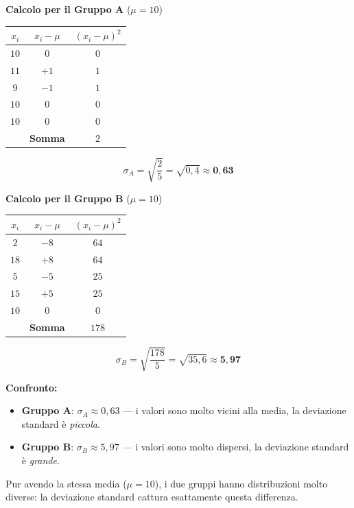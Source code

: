 \documentclass[12pt, a4paper]{article}
\begin{document}
\medskip
\noindent\textbf{Calcolo per il Gruppo A} \quad ($\mu = 10$)

\begin{center}
\begin{tabular}{ccc}
\toprule
$x_i$ & $x_i - \mu$ & $(x_i - \mu)^2$ \\
\midrule
$10$ & $0$  & $0$ \\
$11$ & $+1$ & $1$ \\
$9$  & $-1$ & $1$ \\
$10$ & $0$  & $0$ \\
$10$ & $0$  & $0$ \\
\midrule
     & \textbf{Somma} & $2$ \\
\bottomrule
\end{tabular}
\end{center}

\[
  \sigma_A = \sqrt{\dfrac{2}{5}} = \sqrt{0{,}4} \approx \mathbf{0{,}63}
\]

\medskip
\noindent\textbf{Calcolo per il Gruppo B} \quad ($\mu = 10$)

\begin{center}
\begin{tabular}{ccc}
\toprule
$x_i$ & $x_i - \mu$ & $(x_i - \mu)^2$ \\
\midrule
$2$  & $-8$ & $64$ \\
$18$ & $+8$ & $64$ \\
$5$  & $-5$ & $25$ \\
$15$ & $+5$ & $25$ \\
$10$ & $0$  & $0$  \\
\midrule
     & \textbf{Somma} & $178$ \\
\bottomrule
\end{tabular}
\end{center}

\[
  \sigma_B = \sqrt{\dfrac{178}{5}} = \sqrt{35{,}6} \approx \mathbf{5{,}97}
\]

\medskip
\noindent\textbf{Confronto:}
\begin{itemize}
  \item \textbf{Gruppo A}: $\sigma_A \approx 0{,}63$ — i valori sono molto vicini alla media, la deviazione standard è \emph{piccola}.
  \item \textbf{Gruppo B}: $\sigma_B \approx 5{,}97$ — i valori sono molto dispersi, la deviazione standard è \emph{grande}.
\end{itemize}

Pur avendo la stessa media ($\mu = 10$), i due gruppi hanno distribuzioni molto diverse: la deviazione standard cattura esattamente questa differenza.
\end{document}
